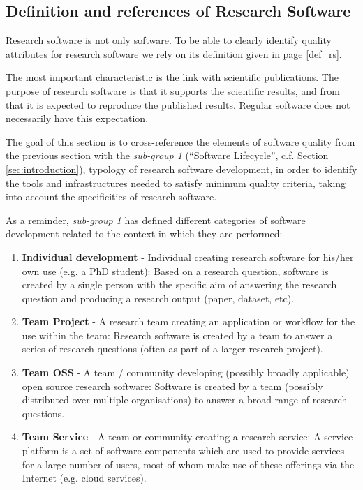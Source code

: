 \subsection{Definition and references of Research Software}
\label{subsec:defrs}

Research software is not only software. To be able to clearly identify quality attributes for research software we rely on its definition given in page \ref{def_rs}.

The most important characteristic is the link with scientific publications. The purpose of research software is that it supports the scientific results, and from that it is expected to reproduce the published results. Regular software does not necessarily have this expectation.

The goal of this section is to cross-reference the elements of software quality from the previous section with the \textit{sub-group 1} \cite{sg1tf2023} (``Software Lifecycle'', c.f. Section \ref{sec:introduction}), typology of research software development, in order to identify the tools and infrastructures needed to satisfy minimum quality criteria, taking into account the specificities of research software.  

As a reminder, \textit{sub-group 1} has defined different categories of software development related to the context in which they are performed:

\begin{enumerate}
    \item \textbf{Individual development} - Individual creating research software for his/her own use (e.g. a PhD student): Based on a research question, software is created by a single person with the specific aim of answering the research question and producing a research output (paper, dataset, etc).
    \item \textbf{Team Project} - A research team creating an application or workflow for the use within the team: Research software is created by a team to answer a series of research questions (often as part of a larger research project).
    \item \textbf{Team OSS} - A team / community developing (possibly broadly applicable) open source research software: Software is created by a team (possibly distributed over multiple organisations) to answer a broad range of research questions.
    \item \textbf{Team Service} - A team or community creating a research service: A service platform is a set of software components which are used to provide services for a large number of users, most of whom make use of these offerings via the Internet (e.g. cloud services).
\end{enumerate}

